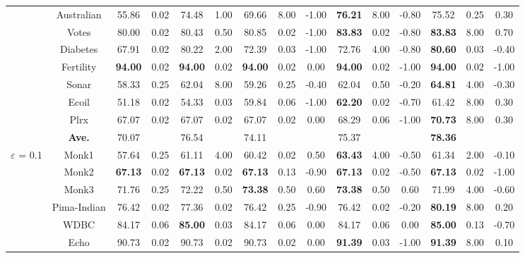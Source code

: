 \documentclass[journal,12pn, onecolumn]{IEEEtran}
\begin{document}
{{{\begin{table}
{{\begin{tabular}{ccccccccccccccc}
          & Australian & 55.86  & 0.02  & 74.48  & 1.00  & 69.66  & 8.00  & -1.00  & \textbf{76.21 } & 8.00  & -0.80  & 75.52  & 0.25  & 0.30  \\
          & Votes & 80.00  & 0.02  & 80.43  & 0.50  & 80.85  & 0.02  & -1.00  & \textbf{83.83 } & 0.02  & -0.80  & \textbf{83.83 } & 8.00  & 0.70  \\
          & Diabetes & 67.91  & 0.02  & 80.22  & 2.00  & 72.39  & 0.03  & -1.00  & 72.76  & 4.00  & -0.80  & \textbf{80.60 } & 0.03  & -0.40  \\
          & Fertility & \textbf{94.00 } & 0.02  & \textbf{94.00 } & 0.02  & \textbf{94.00 } & 0.02  & 0.00  & \textbf{94.00 } & 0.02  & -1.00  & \textbf{94.00 } & 0.02  & -1.00  \\
          & Sonar & 58.33  & 0.25  & 62.04  & 8.00  & 59.26  & 0.25  & -0.40  & 62.04  & 0.50  & -0.20  & \textbf{64.81 } & 4.00  & -0.30  \\
          & Ecoil & 51.18  & 0.02  & 54.33  & 0.03  & 59.84  & 0.06  & -1.00  & \textbf{62.20 } & 0.02  & -0.70  & 61.42  & 8.00  & 0.30  \\
          & Plrx  & 67.07  & 0.02  & 67.07  & 0.02  & 67.07  & 0.02  & 0.00  & 68.29  & 0.06  & -1.00  & \textbf{70.73 } & 8.00  & 0.30  \\
\cmidrule{2-15}          & \textbf{Ave. } & 70.07  &       & 76.54  &       & 74.11  &       &       & 75.37  &       &       & \textbf{78.36 } &       &  \\
    \midrule
    \multirow{18}[4]{*}{$\varepsilon$ = 0.1} & Monk1 & 57.64  & 0.25  & 61.11  & 4.00  & 60.42  & 0.02  & 0.50  & \textbf{63.43}  & 4.00  & -0.50  & 61.34  & 2.00  & -0.10  \\
          & Monk2 & \textbf{67.13}  & 0.02  & \textbf{67.13}  & 0.02  & \textbf{67.13}  & 0.13  & -0.90  & \textbf{67.13}  & 0.02  & -0.50  & \textbf{67.13}  & 0.02  & -1.00  \\
          & Monk3 & 71.76  & 0.25  & 72.22  & 0.50  & \textbf{73.38}  & 0.50  & 0.60  & \textbf{73.38}  & 0.50  & 0.60  & 71.99  & 4.00  & -0.60  \\
          & Pima-Indian & 76.42  & 0.02  & 77.36  & 0.02  & 76.42  & 0.25  & -0.90  & 76.42  & 0.02  & -0.20  & \textbf{80.19}  & 8.00  & 0.20  \\
          & WDBC  & 84.17  & 0.06  & \textbf{85.00}  & 0.03  & 84.17  & 0.06  & 0.00  & 84.17  & 0.06  & 0.00  & \textbf{85.00}  & 0.13  & -0.70  \\
          & Echo  & 90.73  & 0.02  & 90.73  & 0.02  & 90.73  & 0.02  & 0.00  & \textbf{91.39}  & 0.03  & -1.00  & \textbf{91.39}  & 8.00  & 0.10  \\

\end{tabular}}}
\end{table}}}}
\end{document}
